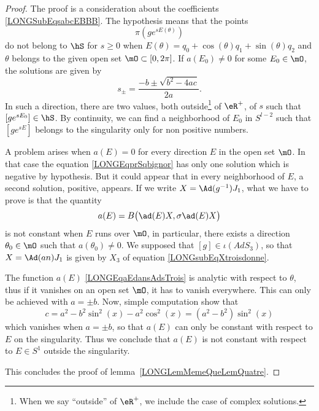 \begin{proof}
	The proof is a consideration about the coefficients \eqref{LONGSubEqsabcEBBB}. The hypothesis means that the points
	\begin{equation}
		\pi\left( g e^{sE(\theta)} \right)
	\end{equation}
	do not belong to $\hS$ for $s\geq 0$ when $E(\theta)=q_0+\cos(\theta)q_1+\sin(\theta)q_2$ and $\theta$ belongs to the given open set $\mO\subset\mathopen[ 0 , 2\pi \mathclose]$. If $a(E_0)\neq 0$ for some $E_0\in\mO$, the solutions are given by
	\begin{equation}
		s_{\pm}=\frac{ -b\pm\sqrt{b^2-4ac} }{ 2a }.
	\end{equation}
	In such a direction, there are two values, both outside\footnote{When we say ``outside'' of $\eR^+$, we include the case of complex solutions.} of $\eR^+$, of $s$ such that $[g e^{sE_0}]\in \hS$. By continuity, we can find a neighborhood of $E_0$ in $S^{l-2}$ such that $[g e^{sE}]$ belongs to the singularity only for non positive numbers.

	A problem arises when $a(E)=0$ for every direction $E$ in the open set $\mO$. In that case the equation \eqref{LONGEqprSqbignor} has only one solution which is negative by hypothesis. But it could appear that in every neighborhood of $E$, a second solution, positive, appears. If we write $X=\Ad(g^{-1})J_1$, what we have to prove is that the quantity
	\begin{equation}
		a(E)=B\big( \ad(E)X,\sigma\ad(E)X \big)
	\end{equation}
	is not constant when $E$ runs over $\mO$, in particular, there exists a direction $\theta_0\in\mO$ such that $a(\theta_0)\neq 0$. We supposed that $[g]\in \iota(AdS_3)$, so that $X=\Ad(an)J_1$ is given by $X_3$ of equation \eqref{LONGsubEqXtroisdonne}.


	The function $a(E)$ \eqref{LONGEqaEdansAdsTrois} is analytic with respect to $\theta$, thus if it vanishes on an open set $\mO$, it has to vanish everywhere. This can only be achieved with $a=\pm b$. Now, simple computation show that
	\begin{equation}
		c=a^2-b^2\sin^2(x)-a^2\cos^2(x)=(a^2-b^2)\sin^2(x)
	\end{equation}
	which vanishes when $a=\pm b$, so that $a(E)$ can only be constant with respect to $E$ on the singularity. Thus we conclude that $a(E)$ is not constant with respect to $E\in S^1$ outside the singularity.

	This concludes the proof of lemma~\ref{LONGLemMemeQueLemQuatre}.
\end{proof}
%


